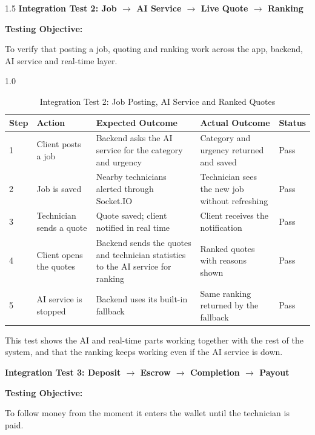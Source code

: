 \documentclass[A4paper,12pt]{report}
\theoremstyle{plain}
\theoremstyle{definition}
\theoremstyle{remark}
\numberwithin{equation}{section}
\begin{document}
\begin{spacing}{1.5}
\textbf{Integration Test 2: Job $\rightarrow$ AI Service $\rightarrow$ Live Quote $\rightarrow$ Ranking}

\textbf{Testing Objective:}

To verify that posting a job, quoting and ranking work across the app, backend, AI service and real-time layer.

\begin{table}[H]
\centering
\caption{Integration Test 2: Job Posting, AI Service and Ranked Quotes}
\begin{spacing}{1.0}
{\small
\begin{tabular}{|p{}|p{}|p{}|p{}|p{}|}
\hline
\textbf{Step} & \textbf{Action} & \textbf{Expected Outcome} & \textbf{Actual Outcome} & \textbf{Status} \\ \hline
1 & Client posts a job & Backend asks the AI service for the category and urgency & Category and urgency returned and saved & Pass \\ \hline
2 & Job is saved & Nearby technicians alerted through Socket.IO & Technician sees the new job without refreshing & Pass \\ \hline
3 & Technician sends a quote & Quote saved; client notified in real time & Client receives the notification & Pass \\ \hline
4 & Client opens the quotes & Backend sends the quotes and technician statistics to the AI service for ranking & Ranked quotes with reasons shown & Pass \\ \hline
5 & AI service is stopped & Backend uses its built-in fallback & Same ranking returned by the fallback & Pass \\ \hline
\end{tabular}}
\end{spacing}
\end{table}

This test shows the AI and real-time parts working together with the rest of the system, and that the ranking keeps working even if the AI service is down.

\textbf{Integration Test 3: Deposit $\rightarrow$ Escrow $\rightarrow$ Completion $\rightarrow$ Payout}

\textbf{Testing Objective:}

To follow money from the moment it enters the wallet until the technician is paid.


\end{spacing}
\end{document}
